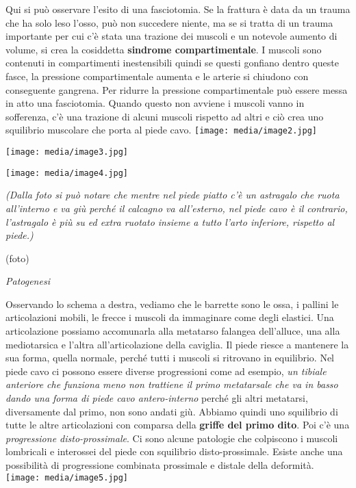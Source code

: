 \documentclass[]{article}
\begin{document}
Qui si può osservare l'esito di una fasciotomia. Se la frattura è data
da un trauma che ha solo leso l'osso, può non succedere niente, ma se si
tratta di un trauma importante per cui c'è stata una trazione dei
muscoli e un notevole aumento di volume, si crea la cosiddetta
\textbf{sindrome compartimentale}. I muscoli sono contenuti in
compartimenti inestensibili quindi se questi gonfiano dentro queste
fasce, la pressione compartimentale aumenta e le arterie si chiudono con
conseguente gangrena. Per ridurre la pressione compartimentale può
essere messa in atto una fasciotomia. Quando questo non avviene i
muscoli vanno in sofferenza, c'è una trazione di alcuni muscoli rispetto
ad altri e ciò crea uno squilibrio muscolare che porta al piede cavo.
\texttt{[image: media/image2.jpg]}

\texttt{[image: media/image3.jpg]}

\texttt{[image: media/image4.jpg]}

\emph{(Dalla foto si può notare che mentre nel piede piatto c'è un
astragalo che ruota all'interno e va giù perché il calcagno va
all'esterno, nel piede cavo è il contrario, l'astragalo è più su ed
extra ruotato insieme a tutto l'arto inferiore, rispetto al piede.)}

(foto)

\emph{Patogenesi}

Osservando lo schema a destra, vediamo che le barrette sono le ossa, i
pallini le articolazioni mobili, le frecce i muscoli da immaginare come
degli elastici. Una articolazione possiamo accomunarla alla metatarso
falangea dell'alluce, una alla mediotarsica e l'altra all'articolazione
della caviglia. Il piede riesce a mantenere la sua forma, quella
normale, perché tutti i muscoli si ritrovano in equilibrio. Nel piede
cavo ci possono essere diverse progressioni come ad esempio, \emph{un
tibiale anteriore che funziona meno non trattiene il primo metatarsale
che va in basso dando una forma di piede cavo antero-interno} perché gli
altri metatarsi, diversamente dal primo, non sono andati giù. Abbiamo
quindi uno squilibrio di tutte le altre articolazioni con comparsa della
\textbf{griffe del primo dito}. Poi c'è una \emph{progressione
disto-prossimale}. Ci sono alcune patologie che colpiscono i muscoli
lombricali e interossei del piede con squilibrio disto-prossimale.
Esiste anche una possibilità di progressione combinata prossimale e
distale della deformità.
\texttt{[image: media/image5.jpg]}
\end{document}
